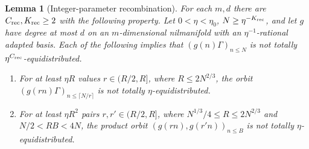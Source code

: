 \documentclass[11pt]{article}
\newtheorem{lemma}[theorem]{Lemma}
\theoremstyle{definition}
\theoremstyle{remark}
\begin{document}
\begin{lemma}[Integer-parameter recombination]\label{gi-recombination}
For each $m,d$ there are $C_{\rm rec},K_{\rm rec}\geq2$ with the following
property.  Let $0<\eta<\eta_0$, $N\geq\eta^{-K_{\rm rec}}$, and let $g$
have degree at most $d$ on an $m$-dimensional nilmanifold with an
$\eta^{-1}$-rational adapted basis.  Each of the following implies that
$(g(n)\Gamma)_{n\leq N}$ is not totally $\eta^{C_{\rm rec}}$-equidistributed.
\begin{enumerate}
\item For at least $\eta R$ values $r\in(R/2,R]$, where
$R\leq2N^{2/3}$, the orbit $(g(rn)\Gamma)_{n\leq\lceil N/r\rceil}$
is not totally $\eta$-equidistributed.
\item For at least $\eta R^2$ pairs $r,r'\in(R/2,R]$, where
$N^{1/3}/4\leq R\leq2N^{2/3}$ and $N/2<RB<4N$, the product orbit
$(g(rn),g(r'n))_{n\leq B}$ is not totally $\eta$-equidistributed.
\end{enumerate}
\end{lemma}
\end{document}
